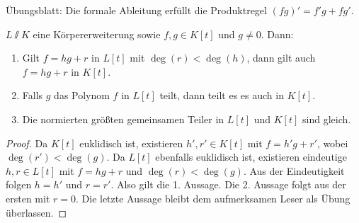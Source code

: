 \documentclass[12pt,a4paper]{scrartcl}
\begin{document}
\noindent
Übungsblatt: Die formale Ableitung erfüllt die Produktregel $(fg)' = f'g+fg'$.

\begin{satz}
	$L\sslash K$ eine Körpererweiterung sowie $f,g\in K[t]$ und $g\neq 0$. Dann:
	\begin{enumerate}
		\item Gilt $f = hg+r$ in $L[t]$ mit $\deg(r)<\deg(h)$, dann gilt auch $f = hg+r$ in $K[t]$.
		\item Falls $g$ das Polynom $f$ in $L[t]$ teilt, dann teilt es es auch in $K[t]$.
		\item Die normierten größten gemeinsamen Teiler in $L[t]$ und $K[t]$ sind gleich.
	\end{enumerate}
\end{satz}
\begin{proof}
	Da $K[t]$ euklidisch ist, existieren $h', r'\in K[t]$ mit $f = h'g+r'$, wobei $\deg(r')<\deg(g)$. Da $L[t]$ ebenfalls euklidisch ist, existieren eindeutige $h, r\in L[t]$ mit $f = hg+r$ und $\deg(r) <\deg(g)$. Aus der Eindeutigkeit folgen $h = h'$ und $r = r'$. Also gilt die 1. Aussage. Die 2. Aussage folgt aus der ersten mit $r = 0$. Die letzte Aussage bleibt dem aufmerksamen Leser als Übung überlassen.
\end{proof}
\end{document}
